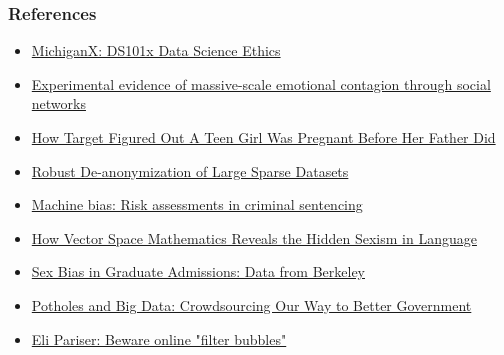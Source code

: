 \documentclass{beamer}
\begin{document}
\begin{frame}\frametitle{References}
\begin{itemize}
	\item \href{https://courses.edx.org/courses/course-v1:MichiganX+DS101x+1T2017/info}{\color{blue}MichiganX: DS101x Data Science Ethics}
	\item \href{http://www.pnas.org/content/111/24/8788.full}{\color{blue}Experimental evidence of massive-scale emotional contagion through social networks}
	\item \href{https://www.forbes.com/sites/kashmirhill/2012/02/16/how-target-figured-out-a-teen-girl-was-pregnant-before-her-father-did/}{\color{blue}How Target Figured Out A Teen Girl Was Pregnant Before Her Father Did}
	\item \href{https://www.cs.cornell.edu/~shmat/shmat_oak08netflix.pdf}{\color{blue}Robust De-anonymization of Large Sparse Datasets}
	\item \href{https://www.propublica.org/article/machine-bias-risk-assessments-in-criminal-sentencing}{\color{blue}Machine bias: Risk assessments in criminal sentencing}
	\item \href{https://www.technologyreview.com/s/602025/how-vector-space-mathematics-reveals-the-hidden-sexism-in-language/}{\color{blue}How Vector Space Mathematics Reveals the Hidden Sexism in Language}
	\item \href{http://homepage.stat.uiowa.edu/~mbognar/1030/Bickel-Berkeley.pdf}{\color{blue}Sex Bias in Graduate Admissions: Data from Berkeley}
	\item \href{https://www.wired.com/insights/2014/03/potholes-big-data-crowdsourcing-way-better-government/}{\color{blue}Potholes and Big Data: Crowdsourcing Our Way to Better Government}
	\item \href{https://www.ted.com/talks/eli_pariser_beware_online_filter_bubbles}{\color{blue}Eli Pariser: Beware online "filter bubbles"}
\end{itemize}
\end{frame}
\end{document}
